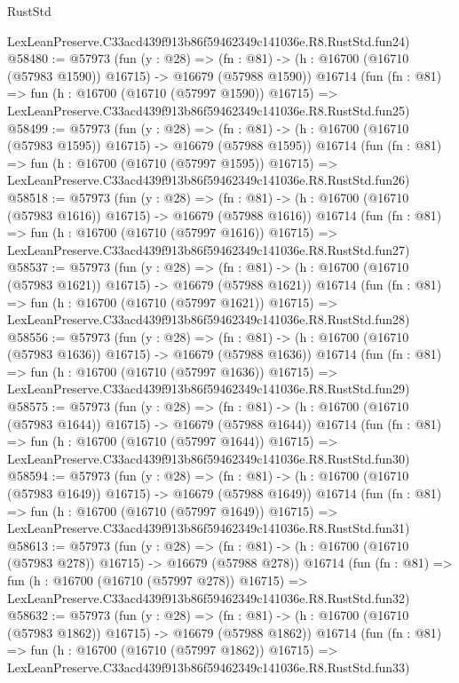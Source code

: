 \begin{lexlean}{RustStd}
\begin{coremodule}
    LexLeanPreserve.C33acd439f913b86f59462349c141036e.R8.RustStd.fun24)
@58480 := @57973
    (fun (y : @28) =>
    (fn : @81) -> (h : @16700 (@16710 (@57983 @1590)) @16715) -> @16679 (@57988 @1590))
    @16714
    (fun (fn : @81) =>
    fun (h : @16700 (@16710 (@57997 @1590)) @16715) =>
    LexLeanPreserve.C33acd439f913b86f59462349c141036e.R8.RustStd.fun25)
@58499 := @57973
    (fun (y : @28) =>
    (fn : @81) -> (h : @16700 (@16710 (@57983 @1595)) @16715) -> @16679 (@57988 @1595))
    @16714
    (fun (fn : @81) =>
    fun (h : @16700 (@16710 (@57997 @1595)) @16715) =>
    LexLeanPreserve.C33acd439f913b86f59462349c141036e.R8.RustStd.fun26)
@58518 := @57973
    (fun (y : @28) =>
    (fn : @81) -> (h : @16700 (@16710 (@57983 @1616)) @16715) -> @16679 (@57988 @1616))
    @16714
    (fun (fn : @81) =>
    fun (h : @16700 (@16710 (@57997 @1616)) @16715) =>
    LexLeanPreserve.C33acd439f913b86f59462349c141036e.R8.RustStd.fun27)
@58537 := @57973
    (fun (y : @28) =>
    (fn : @81) -> (h : @16700 (@16710 (@57983 @1621)) @16715) -> @16679 (@57988 @1621))
    @16714
    (fun (fn : @81) =>
    fun (h : @16700 (@16710 (@57997 @1621)) @16715) =>
    LexLeanPreserve.C33acd439f913b86f59462349c141036e.R8.RustStd.fun28)
@58556 := @57973
    (fun (y : @28) =>
    (fn : @81) -> (h : @16700 (@16710 (@57983 @1636)) @16715) -> @16679 (@57988 @1636))
    @16714
    (fun (fn : @81) =>
    fun (h : @16700 (@16710 (@57997 @1636)) @16715) =>
    LexLeanPreserve.C33acd439f913b86f59462349c141036e.R8.RustStd.fun29)
@58575 := @57973
    (fun (y : @28) =>
    (fn : @81) -> (h : @16700 (@16710 (@57983 @1644)) @16715) -> @16679 (@57988 @1644))
    @16714
    (fun (fn : @81) =>
    fun (h : @16700 (@16710 (@57997 @1644)) @16715) =>
    LexLeanPreserve.C33acd439f913b86f59462349c141036e.R8.RustStd.fun30)
@58594 := @57973
    (fun (y : @28) =>
    (fn : @81) -> (h : @16700 (@16710 (@57983 @1649)) @16715) -> @16679 (@57988 @1649))
    @16714
    (fun (fn : @81) =>
    fun (h : @16700 (@16710 (@57997 @1649)) @16715) =>
    LexLeanPreserve.C33acd439f913b86f59462349c141036e.R8.RustStd.fun31)
@58613 := @57973
    (fun (y : @28) =>
    (fn : @81) -> (h : @16700 (@16710 (@57983 @278)) @16715) -> @16679 (@57988 @278))
    @16714
    (fun (fn : @81) =>
    fun (h : @16700 (@16710 (@57997 @278)) @16715) =>
    LexLeanPreserve.C33acd439f913b86f59462349c141036e.R8.RustStd.fun32)
@58632 := @57973
    (fun (y : @28) =>
    (fn : @81) -> (h : @16700 (@16710 (@57983 @1862)) @16715) -> @16679 (@57988 @1862))
    @16714
    (fun (fn : @81) =>
    fun (h : @16700 (@16710 (@57997 @1862)) @16715) =>
    LexLeanPreserve.C33acd439f913b86f59462349c141036e.R8.RustStd.fun33)

\end{coremodule}
\end{lexlean}
